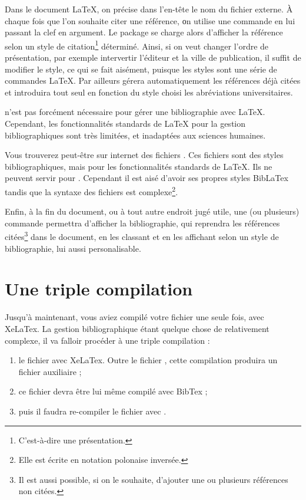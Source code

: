 Dans le document \LaTeX{}, on précise dans l'en-tête le nom du fichier externe. À chaque fois que l'on souhaite citer une référence, οn utilise une commande en lui passant la clef en argument. Le package  se charge alors d'afficher la référence selon un style de citation\footnote{C’est-à-dire une présentation.} déterminé. Ainsi, si on veut changer l'ordre de présentation, par exemple intervertir l'éditeur et la ville de publication, il suffit de modifier le style, ce qui se fait aisément, puisque les styles sont une série de commandes \LaTeX{}. Par ailleurs  gérera automatiquement les références déjà citées et introduira tout seul en fonction du style choisi les abréviations universitaires. 

\begin{anedocte}

 n'est pas forcément nécessaire pour gérer une bibliographie avec \LaTeX{}. Cependant, les fonctionnalités standards de LaTeX pour la gestion bibliographiques sont très limitées, et inadaptées aux sciences humaines. 

Vous trouverez peut-être sur internet des fichiers . Ces fichiers sont des styles bibliographiques, mais pour les fonctionnalités standards de \LaTeX{}. Ils ne peuvent servir pour . Cependant il est aisé d'avoir ses propres styles BibLaTex tandis que la syntaxe des fichiers  est complexe\footnote{Elle est écrite en notation polonaise inversée.}.

\end{anedocte}

Enfin, à la fin du document, ou à tout autre endroit jugé utile, une (ou plusieurs) commande permettra d'afficher la bibliographie, qui reprendra les références citées\footnote{Il est aussi possible, si on le souhaite, d'ajouter une ou plusieurs références non citées.} dans le document, en les classant et en les affichant selon un style de bibliographie, lui aussi personalisable.

\section{Une triple compilation}\label{3compil}

Jusqu'à maintenant, vous aviez compilé votre fichier  une seule fois, avec XeLaTex. La gestion bibliographique étant quelque chose de relativement complexe, il va falloir procéder à une triple compilation :
\begin{enumerate}
\item le fichier  avec XeLaTex. Outre le fichier , cette compilation produira un fichier auxiliaire  ;
\item ce fichier devra être lui même compilé avec BibTex ;
\item puis il faudra re-compiler le fichier  avec \XeLaTeX.
\end{enumerate}

